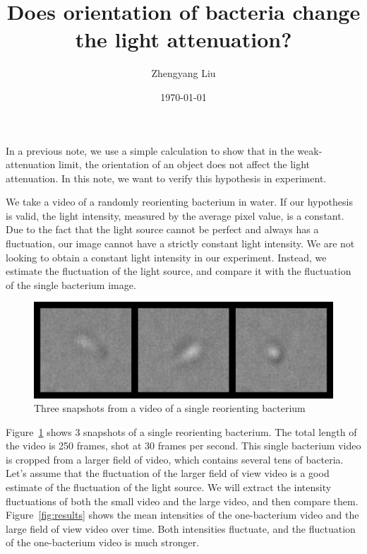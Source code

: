 \documentclass[onecolumn,aps, pre,amsmath,amssymb,longbibliography,11pt]{revtex4-2}
\begin{document}
\title{Does orientation of bacteria change the light attenuation?}

\author{Zhengyang Liu}
\date{\today}
\maketitle


In a previous note, we use a simple calculation to show that in the weak-attenuation limit, the orientation of an object does not affect the light attenuation.
In this note, we want to verify this hypothesis in experiment.

We take a video of a randomly reorienting bacterium in water.
If our hypothesis is valid, the light intensity, measured by the average pixel value, is a constant.
Due to the fact that the light source cannot be perfect and always has a fluctuation, our image cannot have a strictly constant light intensity.
We are not looking to obtain a constant light intensity in our experiment.
Instead, we estimate the fluctuation of the light source, and compare it with the fluctuation of the single bacterium image.

\begin{figure}[h]
  \begin{center}
    \includegraphics[width=5in]{orientation.png}
  \end{center}
  \caption[]{Three snapshots from a video of a single reorienting bacterium}
  \label{fig:orientation}
\end{figure}

Figure~\ref{fig:orientation} shows 3 snapshots of a single reorienting bacterium.
The total length of the video is 250 frames, shot at 30 frames per second.
This single bacterium video is cropped from a larger field of video, which contains several tens of bacteria.
Let's assume that the fluctuation of the larger field of view video is a good estimate of the fluctuation of the light source.
We will extract the intensity fluctuations of both the small video and the large video, and then compare them.
Figure~\ref{fig:results} shows the mean intensities of the one-bacterium video and the large field of view video over time.
Both intensities fluctuate, and the fluctuation of the one-bacterium video is much stronger.
\end{document}
